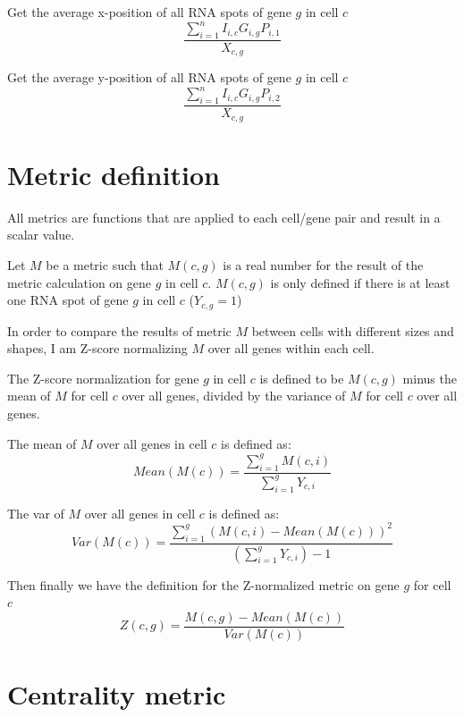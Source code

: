 \documentclass[a4paper,12pt]{article}
\begin{document}
Get the average x-position of all RNA spots of gene $g$ in cell $c$
\begin{equation}
    \frac{\sum_{i=1}^{n} I_{i,c}G_{i,g}P_{i,1}}{X_{c,g}}
\end{equation}

Get the average y-position of all RNA spots of gene $g$ in cell $c$
\begin{equation}
    \frac{\sum_{i=1}^{n} I_{i,c}G_{i,g}P_{i,2}}{X_{c,g}}
\end{equation}



\section{Metric definition}

All metrics are functions that are applied to each cell/gene pair and result in a scalar value.

Let $M$ be a metric such that $M(c,g)$ is a real number for the result of the metric calculation on gene $g$ in cell $c$. $M(c,g)$ is only defined if there is at least one RNA spot of gene $g$ in cell $c$ ($Y_{c,g} = 1$)

In order to compare the results of metric $M$ between cells with different sizes and shapes, I am Z-score normalizing $M$ over all genes within each cell.

The Z-score normalization for gene $g$ in cell $c$ is defined to be $M(c,g)$ minus the mean of $M$ for cell $c$ over all genes, divided by the variance of $M$ for cell $c$ over all genes.

The mean of $M$ over all genes in cell $c$ is defined as:
\begin{equation}
    Mean(M(c)) = \frac{\sum_{i=1}^{g}M(c,i)}{\sum_{i=1}^{g}Y_{c,i}}
\end{equation}

The var of $M$ over all genes in cell $c$ is defined as:
\begin{equation}
    Var(M(c)) = \frac{\sum_{i=1}^{g}(M(c,i)-Mean(M(c)))^{2}}{(\sum_{i=1}^{g}Y_{c,i})-1}
\end{equation}

Then finally we have the definition for the Z-normalized metric on gene $g$ for cell $c$
\begin{equation}
    Z(c,g) = \frac{M(c,g)-Mean(M(c))}{Var(M(c))}
\end{equation}


\section{Centrality metric}
\end{document}
